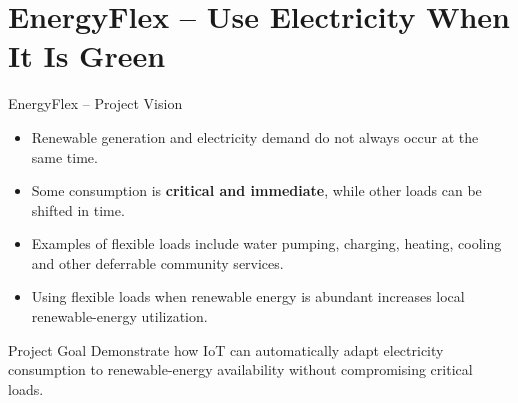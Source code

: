 \section[nosectionpage]{EnergyFlex -- Use Electricity When It Is Green}

\begin{frame}{EnergyFlex -- Project Vision}
\begin{itemize}
    \item Renewable generation and electricity demand do not always occur at the same time.
    \item Some consumption is \textbf{critical and immediate}, while other loads can be shifted in time.
    \item Examples of flexible loads include water pumping, charging, heating, cooling and other deferrable community services.
    \item Using flexible loads when renewable energy is abundant increases local renewable-energy utilization.
\end{itemize}

\begin{block}{Project Goal}
Demonstrate how IoT can automatically adapt electricity consumption to renewable-energy availability without compromising critical loads.
\end{block}
\end{frame}
